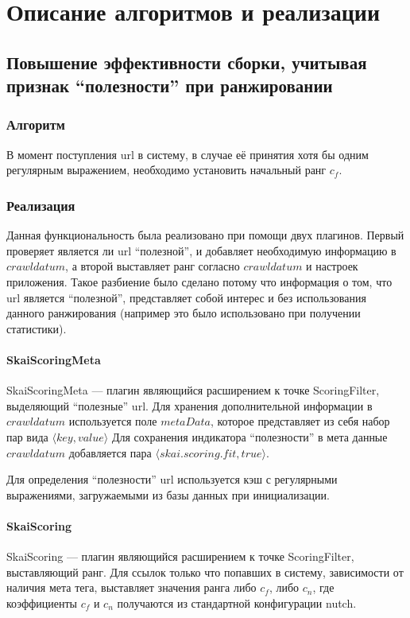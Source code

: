 \chapter{Описание алгоритмов и реализации}
\section*{Повышение эффективности сборки, учитывая признак ``полезности'' при ранжировании}
\subsection*{Алгоритм}
В момент поступления url в систему, в случае её принятия хотя бы одним регулярным выражением, необходимо установить начальный ранг $c_{f}$.
\subsection*{Реализация}
Данная функциональность была реализовано при помощи двух плагинов. Первый проверяет является ли url ``полезной'', и добавляет необходимую информацию в $crawldatum$, а второй выставляет ранг согласно $crawldatum$ и настроек приложения. Такое разбиение было сделано потому что информация о том, что url является ``полезной'', представляет собой интерес и без использования данного ранжирования (например это было использовано при получении статистики).
\subsubsection*{SkaiScoringMeta}
\label{sec:scoringmeta}
SkaiScoringMeta --- плагин являющийся расширением к точке ScoringFilter, выделяющий ``полезные'' url. Для хранения дополнительной информации в $crawldatum$ используется поле $metaData$, которое представляет из себя набор пар вида $\langle key, value\rangle$
Для сохранения индикатора ``полезности'' в мета данные $crawldatum$ добавляется пара $\langle skai.scoring.fit, true\rangle$.

Для определения ``полезности'' url используется кэш с регулярными выражениями, загружаемыми из базы данных при инициализации. 

\subsubsection*{SkaiScoring}
SkaiScoring --- плагин являющийся расширением к точке ScoringFilter, выставляющий ранг. Для ссылок только что попавших в систему, зависимости от наличия мета тега, выставляет значения ранга либо $c_{f}$, либо $c_{n}$, где коэффициенты $c_{f}$ и $c_{n}$ получаются из стандартной конфигурации nutch.

